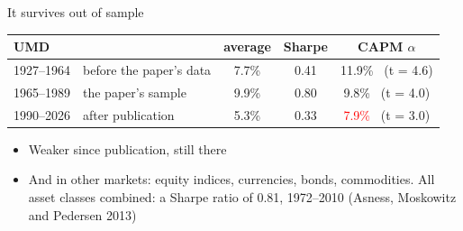\documentclass[aspectratio=169,10pt]{beamer}
\begin{document}
\begin{frame}{It survives out of sample}
\begin{center}
\renewcommand{\arraystretch}{1.4}
\begin{tabular}{llccc}
\toprule
UMD & & average & Sharpe & CAPM $\alpha$ \\
\midrule
1927--1964 & before the paper's data & 7.7\% & 0.41 & 11.9\% \ (t = 4.6) \\
1965--1989 & the paper's sample & 9.9\% & 0.80 & \phantom{1}9.8\% \ (t = 4.0) \\
1990--2026 & after publication & 5.3\% & 0.33 & \textcolor{red}{\phantom{1}7.9\%} \ (t = 3.0) \\
\bottomrule
\end{tabular}
\end{center}
\vskip 10pt
\begin{itemize}
\item Weaker since publication, still there
\vskip 8pt
\item And in other markets: equity indices, currencies, bonds, commodities. All asset classes combined: a Sharpe ratio of 0.81, 1972--2010 (Asness, Moskowitz and Pedersen 2013)
\end{itemize}
\end{frame}
\end{document}
